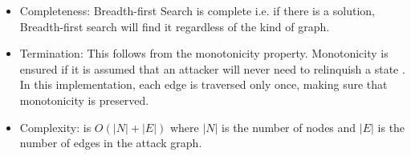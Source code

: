 \begin{itemize}
	\item Completeness: Breadth-first Search is complete i.e. if there is a solution, Breadth-first search will find it regardless of the kind of graph.
	\item Termination: This follows from the monotonicity property. Monotonicity is ensured if it is assumed that an attacker will never need to relinquish a state \cite{ingols2006practical, ou2006scalable, ammann2002scalable}. In this implementation, each edge is traversed only once, making sure that monotonicity is preserved.
	\item  Complexity: is $O(|N| + |E|)$ where $|N|$ is the number of nodes and $|E|$ is the number of edges in the attack graph.
\end{itemize}


